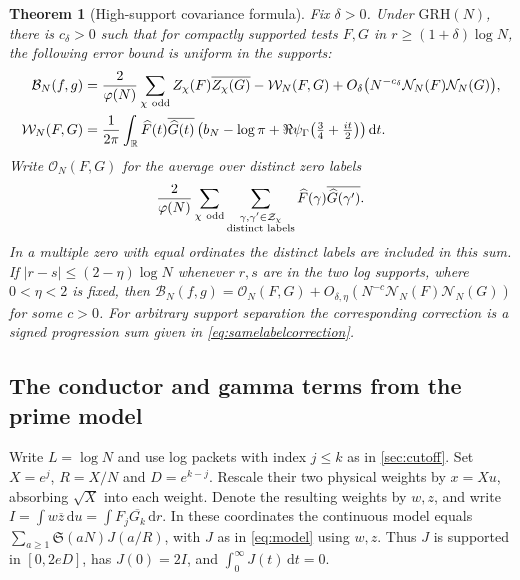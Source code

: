 \documentclass[11pt,a4paper]{article}
\numberwithin{equation}{section}
\newtheorem{theorem}{Theorem}[section]
\newcommand{\SSS}{\mathfrak S}
\newcommand{\grh}{\mathrm{GRH}}
\newcommand{\ud}{\mathrm d}
\newcommand{\B}{\mathcal B_N}
\newcommand{\NN}{\mathcal N_N}
\begin{document}
\begin{theorem}[High-support covariance formula]
\label{thm:zeros}
Fix $\delta>0$. Under $\grh(N)$, there is $c_\delta>0$
such that for compactly supported tests $F,G$ in
$r\ge(1+\delta)\log N$, the following error bound is uniform in
the supports:
\begin{align}
 \B(f,g)
 &=\frac{2}{\varphi(N)}\sum_{\chi\ {\rm odd}}
       Z_\chi(F)\overline{Z_\chi(G)}
    -\mathcal W_N(F,G)
    +O_\delta\bigl(N^{-c_\delta}\NN(F)\NN(G)\bigr),
 \label{eq:zeroform}\\
 \mathcal W_N(F,G)
 &=\frac1{2\pi}\int_{\mathbb R}\widehat F(t)\overline{\widehat G(t)}
     \left(b_N-\log\pi+\Re\psi_\Gamma\!\left(\tfrac34+\tfrac{it}{2}\right)\right)
     \ud t .
 \label{eq:archdensity}
\end{align}
Write $\mathcal O_N(F,G)$ for the average over distinct zero labels
\[
 \frac{2}{\varphi(N)}\sum_{\chi\ {\rm odd}}
     \sum_{\substack{\gamma,\gamma'\in\mathcal Z_\chi\\
                     \text{distinct labels}}}
         \widehat F(\gamma)\overline{\widehat G(\gamma')}.
\]
In a multiple zero with equal ordinates the distinct labels are
included in this sum.
If $|r-s|\le(2-\eta)\log N$ whenever $r,s$ are in the two
log supports, where $0<\eta<2$ is fixed, then
$\B(f,g)=\mathcal O_N(F,G)+O_{\delta,\eta}
(N^{-c}\NN(F)\NN(G))$ for some $c>0$.
For arbitrary support separation the corresponding correction
is a signed progression sum given in \cref{eq:samelabelcorrection}.
\end{theorem}

\subsection{The conductor and gamma terms from the prime model}

Write $L=\log N$ and use log packets with index $j\le k$ as in
\cref{sec:cutoff}. Set $X=e^j$, $R=X/N$ and $D=e^{k-j}$.
Rescale their two physical weights by $x=Xu$, absorbing $\sqrt X$
into each weight. Denote the resulting weights by $w,z$, and write
$I=\int w\overline z\,\ud u=\int F_j\overline{G_k}\,\ud r$.
In these coordinates the continuous model equals
$\sum_{a\ge1}\SSS(aN)J(a/R)$, with $J$ as in \cref{eq:model}
using $w,z$. Thus $J$ is supported in $[0,2eD]$, has
$J(0)=2I$, and $\int_0^\infty J(t)\,\ud t=0$.
\end{document}
